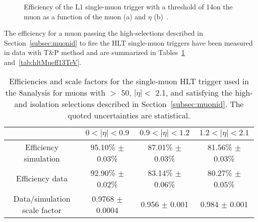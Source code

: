 \begin{figure}[!htb]
\centering
{}
\caption{Efficiency of the L1 single-muon trigger with a threshold of 14\GeV on the muon \pt as a function of the muon \pt (a) and $\eta$ (b)~\cite{Brooke:1496888}.}
\label{fig:mu_L1trigg}
\end{figure}

The efficiency for a muon passing the high-\pt selections described in Section~\ref{subsec:muonid} to fire the HLT single-muon triggers have been measured in data with T\&P method and are summarized in Tables~\ref{tab:hltMueff8TeV} and~\ref{tab:hltMueff13TeV}. 

\begin{table}[!htb]
\centering
\caption{Efficiencies and scale factors for the single-muon HLT trigger used in the 8\TeV analysis
for muons with \pt $>$ 50\GeV, $|\eta| <$ 2.1, and satisfying the high-\pt and isolation selections described in Section~\ref{subsec:muonid}.
The quoted uncertainties are statistical.}
\begin{tabular}{ c | c | c | c}
 & $0 < |\eta| < 0.9$ & $0.9 < |\eta| < 1.2$ & $1.2 < |\eta| < 2.1$\\
\hline
\hline
Efficiency simulation & 95.10\% $\pm$ 0.03\% & 87.01\% $\pm$ 0.03\% & 81.56\% $\pm$ 0.03\%\\
Efficiency data & 92.90\% $\pm$ 0.02\% & 83.14\% $\pm$ 0.06\% & 80.27\% $\pm$ 0.05\%\\
Data/simulation scale factor & 0.9768 $\pm$ 0.0004 & 0.956 $\pm$ 0.001 & 0.984 $\pm$ 0.001\\
\hline 
\end{tabular}
\label{tab:hltMueff8TeV}
\end{table}

